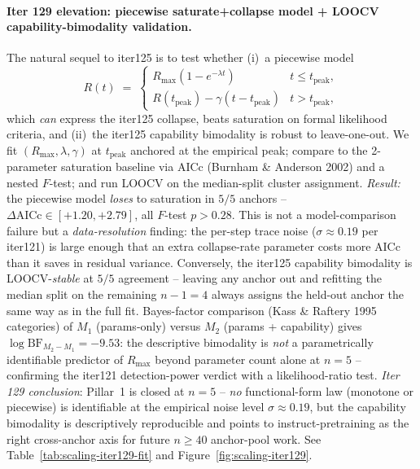 \paragraph{Iter 129 elevation: piecewise saturate+collapse model + LOOCV capability-bimodality validation.}
\label{par:scaling-iter129}
The natural sequel to iter125 is to test whether (i)~a piecewise
model
\begin{equation}
  \label{eq:scaling-iter129-pw}
  R(t) \;=\; \begin{cases}
    R_{\max}(1 - e^{-\lambda t}) & t \le t_\mathrm{peak}, \\
    R(t_\mathrm{peak}) - \gamma(t - t_\mathrm{peak}) & t > t_\mathrm{peak},
  \end{cases}
\end{equation}
which \emph{can} express the iter125 collapse, beats saturation on
formal likelihood criteria, and (ii)~the iter125 capability
bimodality is robust to leave-one-out.  We fit
$(R_{\max}, \lambda, \gamma)$ at $t_\mathrm{peak}$ anchored at the
empirical peak; compare to the 2-parameter saturation baseline via
AICc (Burnham \& Anderson 2002) and a nested $F$-test; and run
LOOCV on the median-split cluster assignment.
\emph{Result:} the piecewise model \emph{loses} to saturation in
$5/5$ anchors -- $\Delta\text{AICc} \in [+1.20, +2.79]$, all
$F$-test $p > 0.28$.  This is not a model-comparison failure but
a \emph{data-resolution} finding: the per-step trace noise
($\sigma \approx 0.19$ per iter121) is large enough that an
extra collapse-rate parameter costs more AICc than it saves in
residual variance.  Conversely, the iter125 capability bimodality
is LOOCV-\emph{stable} at $5/5$ agreement -- leaving any anchor
out and refitting the median split on the remaining $n - 1 = 4$
always assigns the held-out anchor the same way as in the full
fit.  Bayes-factor comparison (Kass \& Raftery 1995 categories)
of $M_1$ (params-only) versus $M_2$ (params + capability) gives
$\log \mathrm{BF}_{M_2 - M_1} = -9.53$: the descriptive bimodality
is \emph{not} a parametrically identifiable predictor of $R_{\max}$
beyond parameter count alone at $n = 5$ -- confirming the iter121
detection-power verdict with a likelihood-ratio test.
\emph{Iter 129 conclusion}: Pillar~1 is closed at $n=5$ --
\emph{no} functional-form law (monotone or piecewise) is
identifiable at the empirical noise level $\sigma \approx 0.19$,
but the capability bimodality is descriptively reproducible and
points to instruct-pretraining as the right cross-anchor axis
for future $n \ge 40$ anchor-pool work.  See
Table~\ref{tab:scaling-iter129-fit} and
Figure~\ref{fig:scaling-iter129}.

